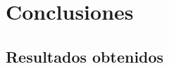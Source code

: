 {
  \linespread{1}
  \cleardoublepage  
  \chapter{Conclusiones}
  \label{chap:cap5}
}

    \section {Resultados obtenidos}

% 

